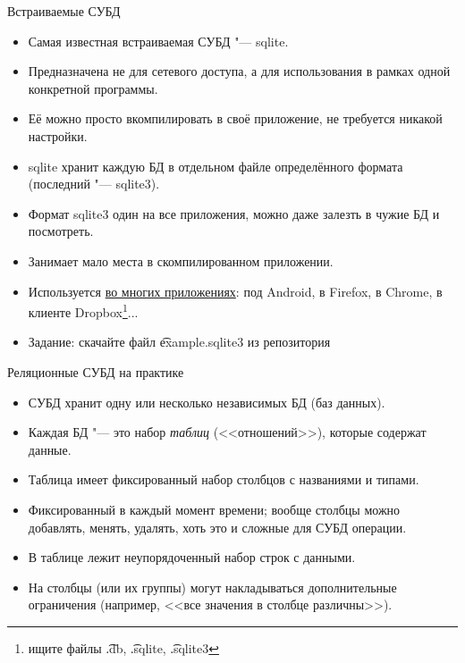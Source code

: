 \begin{frame}{Встраиваемые СУБД}
	\begin{itemize}
		\item Самая известная встраиваемая СУБД "--- sqlite.
		\item Предназначена не для сетевого доступа, а для использования в рамках одной конкретной программы.
		\item Её можно просто вкомпилировать в своё приложение, не требуется никакой настройки.
		\item sqlite хранит каждую БД в отдельном файле определённого формата (последний "--- sqlite3).
		\item Формат sqlite3 один на все приложения, можно даже залезть в чужие БД и посмотреть.
		\item Занимает мало места в скомпилированном приложении.
		\item
			Используется \href{http://www.sqlite.org/famous.html}{во многих приложениях}:
			под Android, в Firefox, в Chrome, в клиенте Dropbox\footnote{ищите файлы \t{.db}, \t{.sqlite}, \t{.sqlite3}}...
		\item Задание: скачайте файл \t{example.sqlite3} из репозитория
	\end{itemize}
\end{frame}

\begin{frame}{Реляционные СУБД на практике}
	\begin{itemize}
		\item СУБД хранит одну или несколько независимых БД (баз данных).
		\item Каждая БД "--- это набор \textit{таблиц} (<<отношений>>), которые содержат данные.
		\item Таблица имеет фиксированный набор столбцов с названиями и типами.
		\item Фиксированный в каждый момент времени; вообще столбцы можно добавлять, менять, удалять, хоть это и сложные для СУБД операции.
		\item В таблице лежит неупорядоченный набор строк с данными.
		\item На столбцы (или их группы) могут накладываться дополнительные ограничения (например, <<все значения в столбце различны>>).
	\end{itemize}
\end{frame}
